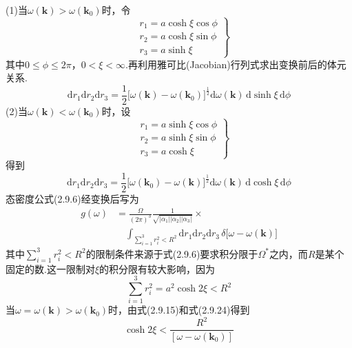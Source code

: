 (1)当$\omega(\boldsymbol{k})>\omega(\boldsymbol{k}_0)$时，令
\begin{equation}
\left.\begin{aligned}
  &r_1=a\cosh\xi\cos\phi\\
  &r_2=a\cosh\xi\sin\phi\\
  &r_3=a\sinh\xi
\end{aligned}\right\}
\end{equation}
其中$0\leqslant\phi\leqslant2\pi$，$0<\xi<\infty$.再利用雅可比(Jacobian)行列式求出变换前后的体元关系.
\begin{equation}
  \mathrm{d}r_1\mathrm{d}r_2\mathrm{d}r_3
  =\frac{1}{2}\bigl[\omega(\boldsymbol{k})-\omega(\boldsymbol{k}_0)\bigr]^{\frac{1}{2}}
  \mathrm{d}\omega(\boldsymbol{k})\,\mathrm{d}\sinh\xi\,\mathrm{d}\phi
\end{equation}
(2)当$\omega(\boldsymbol{k})<\omega(\boldsymbol{k}_0)$时，设
\begin{equation}
\left.\begin{aligned}
  &r_1=a\sinh\xi\cos\phi\\
  &r_2=a\sinh\xi\sin\phi\\
  &r_3=a\cosh\xi
\end{aligned}\right\}
\end{equation}
得到
\begin{equation}
  \mathrm{d}r_1\mathrm{d}r_2\mathrm{d}r_3
  =\frac{1}{2}\bigl[\omega(\boldsymbol{k}_0)-\omega(\boldsymbol{k})\bigr]^{\frac{1}{2}}
  \mathrm{d}\omega(\boldsymbol{k})\,\mathrm{d}\cosh\xi\,\mathrm{d}\phi
\end{equation}
态密度公式(2.9.6)经变换后写为
\begin{equation}
\begin{aligned}
  g(\omega)&=\frac{\Omega}{(2\pi)^3}
  \frac{1}{\sqrt{|\alpha_1||\alpha_2||\alpha_3|}}\times\\
  &\quad\int_{\sum_{i=1}^{3}r_i^2<R^2}
  \mathrm{d}r_1\mathrm{d}r_2\mathrm{d}r_3\,
  \delta\bigl[\omega-\omega(\boldsymbol{k})\bigr]
\end{aligned}
\end{equation}
其中$\sum_{i=1}^{3}r_i^2<R^2$的限制条件来源于式(2.9.6)要求积分限于$\Omega^{*}$之内，而$R$是某个固定的数.这一限制对$\xi$的积分限有较大影响，因为
\begin{equation}
  \sum_{i=1}^{3}r_i^2=a^2\cosh2\xi<R^2
\end{equation}
当$\omega=\omega(\boldsymbol{k})>\omega(\boldsymbol{k}_0)$时，由式(2.9.15)和式(2.9.24)得到
\begin{equation}
  \cosh2\xi<\frac{R^2}{[\omega-\omega(\boldsymbol{k}_0)]}
\end{equation}
